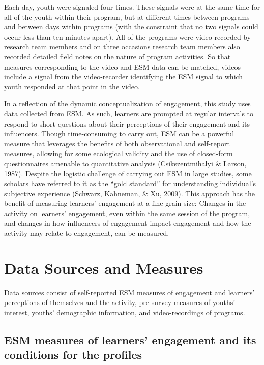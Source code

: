 \documentclass[]{msu-thesis}
\theoremstyle{definition}
\theoremstyle{definition}
\theoremstyle{definition}
\theoremstyle{remark}
\begin{document}
Each day, youth were signaled four times. These signals were at the same
time for all of the youth within their program, but at different times
between programs and between days within programs (with the constraint
that no two signals could occur less than ten minutes apart). All of the
programs were video-recorded by research team members and on three
occasions research team members also recorded detailed field notes on
the nature of program activities. So that measures corresponding to the
video and ESM data can be matched, videos include a signal from the
video-recorder identifying the ESM signal to which youth responded at
that point in the video.

In a reflection of the dynamic conceptualization of engagement, this
study uses data collected from ESM. As such, learners are prompted at
regular intervals to respond to short questions about their perceptions
of their engagement and its influencers. Though time-consuming to carry
out, ESM can be a powerful measure that leverages the benefits of both
observational and self-report measures, allowing for some ecological
validity and the use of closed-form questionnaires amenable to
quantitative analysis (Csikszentmihalyi \& Larson, 1987). Despite the
logistic challenge of carrying out ESM in large studies, some scholars
have referred to it as the ``gold standard'' for understanding
individual's subjective experience (Schwarz, Kahneman, \& Xu, 2009).
This approach has the benefit of measuring learners' engagement at a
fine grain-size: Changes in the activity on learners' engagement, even
within the same session of the program, and changes in how influencers
of engagement impact engagement and how the activity may relate to
engagement, can be measured.

\section{Data Sources and Measures}\label{data-sources-and-measures}

Data sources consist of self-reported ESM measures of engagement and
learners' perceptions of themselves and the activity, pre-survey
measures of youths' interest, youths' demographic information, and
video-recordings of programs.

\subsection{ESM measures of learners' engagement and its conditions for
the
profiles}\label{esm-measures-of-learners-engagement-and-its-conditions-for-the-profiles}
\end{document}
